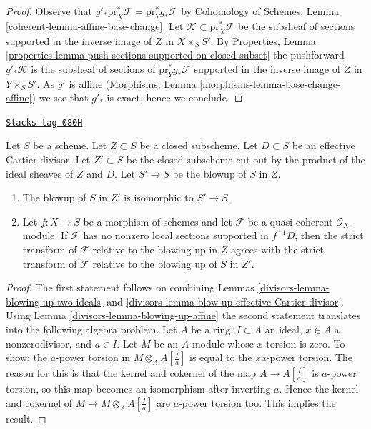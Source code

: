 \begin{proof}
Observe that $g'_*\text{pr}_X^*\mathcal{F} = \text{pr}_Y^*g_*\mathcal{F}$
by Cohomology of Schemes, Lemma \ref{coherent-lemma-affine-base-change}.
Let $\mathcal{K} \subset \text{pr}_X^*\mathcal{F}$ be the subsheaf
of sections supported in the inverse image of $Z$ in $X \times_S S'$.
By Properties, Lemma
\ref{properties-lemma-push-sections-supported-on-closed-subset}
the pushforward $g'_*\mathcal{K}$ is the subsheaf of sections of
$\text{pr}_Y^*g_*\mathcal{F}$ supported in the inverse
image of $Z$ in $Y \times_S S'$. As $g'$ is affine
(Morphisms, Lemma \ref{morphisms-lemma-base-change-affine})
we see that $g'_*$ is exact, hence we conclude.
\end{proof}

\begin{lemma}
\label{divisors-lemma-strict-transform-different-centers}
\href{https://stacks.math.columbia.edu/tag/080H}{\texttt{Stacks tag 080H}}

Let $S$ be a scheme. Let $Z \subset S$ be a closed subscheme.
Let $D \subset S$ be an effective Cartier divisor.
Let $Z' \subset S$ be the closed subscheme cut out by the product
of the ideal sheaves of $Z$ and $D$.
Let $S' \to S$ be the blowup of $S$ in $Z$.
\begin{enumerate}
\item The blowup of $S$ in $Z'$ is isomorphic to $S' \to S$.
\item Let $f : X \to S$ be a morphism of schemes and let $\mathcal{F}$
be a quasi-coherent $\mathcal{O}_X$-module. If $\mathcal{F}$ has
no nonzero local sections supported in $f^{-1}D$, then the
strict transform of $\mathcal{F}$ relative to the blowing up
in $Z$ agrees with the strict transform of $\mathcal{F}$ relative
to the blowing up of $S$ in $Z'$.
\end{enumerate}
\end{lemma}

\begin{proof}

The first statement follows on combining
Lemmas \ref{divisors-lemma-blowing-up-two-ideals} and
\ref{divisors-lemma-blow-up-effective-Cartier-divisor}.
Using Lemma \ref{divisors-lemma-blowing-up-affine} the second statement
translates into the
following algebra problem. Let $A$ be a ring, $I \subset A$ an ideal,
$x \in A$ a nonzerodivisor, and $a \in I$. Let $M$ be an $A$-module
whose $x$-torsion is zero. To show: the $a$-power torsion in
$M \otimes_A A[\frac{I}{a}]$ is equal to the $xa$-power torsion.
The reason for this is that the kernel and cokernel of the map
$A \to A[\frac{I}{a}]$ is $a$-power torsion, so this map becomes an
isomorphism after inverting $a$. Hence the kernel
and cokernel of $M \to M \otimes_A A[\frac{I}{a}]$ are $a$-power
torsion too. This implies the result.
\end{proof}

